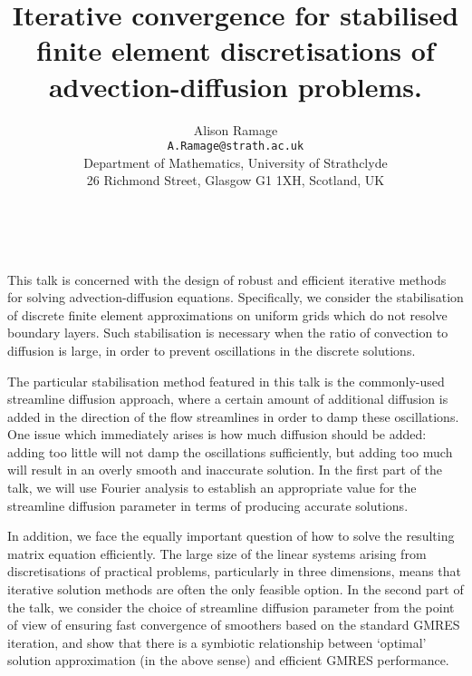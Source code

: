 \documentclass[11pt]{article}
\date{ ~ \hspace{-4mm}}
\title{Iterative convergence for stabilised finite element discretisations of advection-diffusion problems.  }
\author{Alison Ramage \\ {\tt  A.Ramage@strath.ac.uk} \\ Department of Mathematics,  University of Strathclyde \\ 26 Richmond Street, Glasgow G1 1XH, Scotland, UK}
\begin{document}
\maketitle
\thispagestyle{empty}





 



This talk is concerned with the design of robust and 
efficient iterative methods for solving advection-diffusion
equations. Specifically, we consider the stabilisation
of discrete finite element approximations on uniform
grids which do not resolve boundary layers. Such
stabilisation is necessary when the ratio of convection to 
diffusion is large, in order to prevent oscillations in the discrete 
solutions. 



The particular stabilisation method featured in this talk
is the commonly-used streamline diffusion approach, where
a certain amount of additional diffusion is added in the
direction of the flow streamlines  in order to damp
these oscillations. One issue which immediately arises is
how much  diffusion should be added: adding too little will not
damp the oscillations sufficiently, but adding too much will result in
an overly smooth and inaccurate solution. In the first part
of the talk, we will use Fourier analysis
to establish an appropriate value for the streamline
diffusion parameter in terms of producing accurate solutions.



In addition, we face the equally important question of how to solve the resulting
matrix equation efficiently. The large size of the linear systems
arising from discretisations of practical problems, particularly
in three dimensions, means that iterative solution methods are often
the only feasible option. In the second part of the talk, we consider
the choice of streamline diffusion parameter from the point of view
of ensuring fast convergence of smoothers based on the standard
GMRES iteration, and show that there is a symbiotic relationship between 
`optimal' solution approximation (in the above sense) and efficient
GMRES performance.
\end{document}
